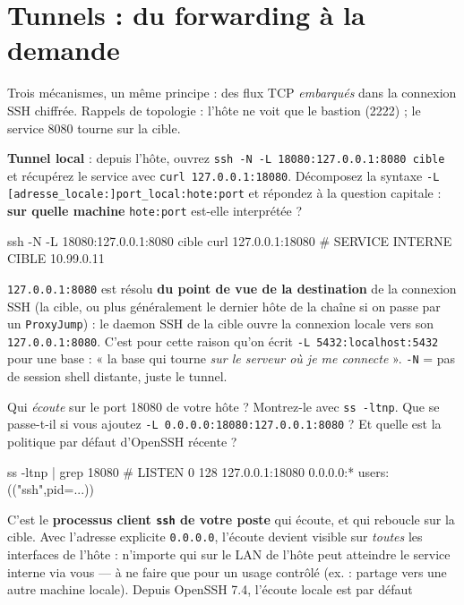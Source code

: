 \documentclass[a4paper,10pt]{exam}
\begin{document}
\section{Tunnels : du forwarding à la demande}

Trois mécanismes, un même principe : des flux TCP \emph{embarqués} dans la connexion SSH
chiffrée. Rappels de topologie : l'hôte ne voit que le bastion (2222) ; le service 8080
tourne sur la cible.

\begin{questions}
\question \textbf{Tunnel local} : depuis l'hôte, ouvrez
\texttt{ssh -N -L 18080:127.0.0.1:8080 cible} et récupérez le service avec
\texttt{curl 127.0.0.1:18080}. Décomposez la syntaxe \texttt{-L
[adresse\_locale:]port\_local:hote:port} et répondez à la question capitale :
\textbf{sur quelle machine} \texttt{hote:port} est-elle interprétée ?
\begin{solution}
\begin{bashcode}
ssh -N -L 18080:127.0.0.1:8080 cible
curl 127.0.0.1:18080
# SERVICE INTERNE CIBLE 10.99.0.11
\end{bashcode}
\texttt{127.0.0.1:8080} est résolu \textbf{du point de vue de la destination} de la
connexion SSH (la cible, ou plus généralement le dernier hôte de la chaîne si on passe
par un \texttt{ProxyJump}) : le daemon SSH de la cible ouvre la connexion locale vers son
\texttt{127.0.0.1:8080}. C'est pour cette raison qu'on écrit
\texttt{-L 5432:localhost:5432} pour une base : « la base qui tourne \emph{sur le serveur
où je me connecte} ».
\texttt{-N} = pas de session shell distante, juste le tunnel.
\end{solution}
\question Qui \emph{écoute} sur le port 18080 de votre hôte ? Montrez-le avec
\texttt{ss -ltnp}. Que se passe-t-il si vous ajoutez
\texttt{-L 0.0.0.0:18080:127.0.0.1:8080} ? Et quelle est la politique par défaut d'OpenSSH
récente ?
\begin{solution}
\begin{bashcode}
ss -ltnp | grep 18080
# LISTEN  0  128  127.0.0.1:18080  0.0.0.0:*  users:(("ssh",pid=...))
\end{bashcode}
C'est le \textbf{processus client \texttt{ssh} de votre poste} qui écoute, et qui reboucle
sur la cible. Avec l'adresse explicite \texttt{0.0.0.0}, l'écoute devient visible sur
\emph{toutes} les interfaces de l'hôte : n'importe qui sur le LAN de l'hôte peut atteindre
le service interne via vous — à ne faire que pour un usage contrôlé (ex. : partage vers
une autre machine locale). Depuis OpenSSH 7.4, l'écoute locale est par défaut

\end{solution}
\end{questions}
\end{document}
